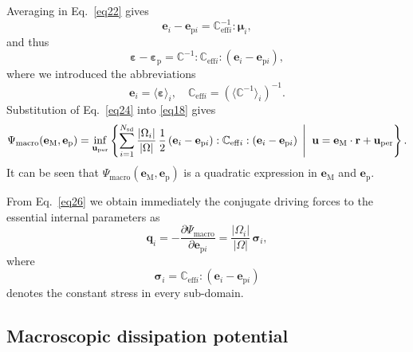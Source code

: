 \documentclass[final,1p,times]{elsarticle}
\newcommand{\beps}{\boldsymbol{\varepsilon}}
\newcommand{\bfmu}{\boldsymbol{\mu}}
\newcommand{\bfsigma}{\boldsymbol{\sigma}}
\newcommand{\bepsp}{\boldsymbol{\varepsilon}_\mathrm{p}}
\newcommand{\be}{\begin{equation}}
\newcommand{\ee}{\end{equation}}
\newcommand{\bfm}[1]{ \mathbf{#1} }
\renewcommand{\inf}[3]{
\underset{#1}{\mathrm{inf}}\left\lbrace #2 \; \left| \vphantom{#2}\vphantom{#3} \right. \; #3 \right\rbrace
}
\begin{document}
Averaging in Eq.\  \eqref{eq22} gives
\be
\label{eq23}
\bfm{e}_i - \bfm{e}_{\mathrm{p}i} = \mathbb{C}_{\mathrm{eff}i}^{-1} : \bfmu_{i},
\ee
and thus
\be
\label{eq24}
\beps - \bepsp = \mathbb{C}^{-1} : \mathbb{C}_{\mathrm{eff}i} : ( \bfm{e}_i - \bfm{e}_{\mathrm{p}i} ),
\ee
where we introduced the abbreviations
\be
\label{eq25}
\bfm{e}_i = \langle \beps \rangle_i, \quad \mathbb{C}_{\mathrm{eff}i} = \left( \langle 
\mathbb{C}^{-1} \rangle_i \right)^{-1}.
\ee
Substitution of Eq.\  \eqref{eq24} into \eqref{eq18} gives
\be
\label{eq26}
\Psi_\mathrm{macro}(\bfm{e}_\mathrm{M},\bfm{e}_{\mathrm{p}} ) =
\inf{\bfm{u}_\mathrm{per}}{\sum_{i=1}^{N_\mathrm{sd}} \frac{|\Omega_i|}{|\Omega|} \, \frac{1}{2} \left( \bfm{e}_i - \bfm{e}_{\mathrm{p}i} \right) : \mathbb{C}_{\mathrm{eff}i} : \left( \bfm{e}_i - \bfm{e}_{\mathrm{p}i} \right)}
{\bfm{u} = \bfm{e}_\mathrm{M}\cdot \bfm{r} + \bfm{u}_\mathrm{per}}.
\ee
It can be seen that $\Psi_\mathrm{macro}(\bfm{e}_\mathrm{M},\bfm{e}_{\mathrm{p}} )$ is a quadratic expression in $\bfm{e}_\mathrm{M}$ and $\bfm{e}_{\mathrm{p}}$.

From Eq.\  \eqref{eq26} we obtain immediately the conjugate driving forces to the essential internal parameters as
\be
\label{eq26a}
\bfm{q}_i = -\frac{\partial \Psi_\mathrm{macro}}{\partial \bfm{e}_{\mathrm{p}i}} = \frac{|\Omega_i|}{|\Omega|} \, \bfsigma_i,
\ee
where
\be
\label{eq26b}
\bfsigma_i = \mathbb{C}_{\mathrm{eff}i} : \left( \bfm{e}_i - \bfm{e}_{\mathrm{p}i} \right)
\ee
denotes the constant stress in every sub-domain.

\subsection{Macroscopic dissipation potential}
\end{document}
